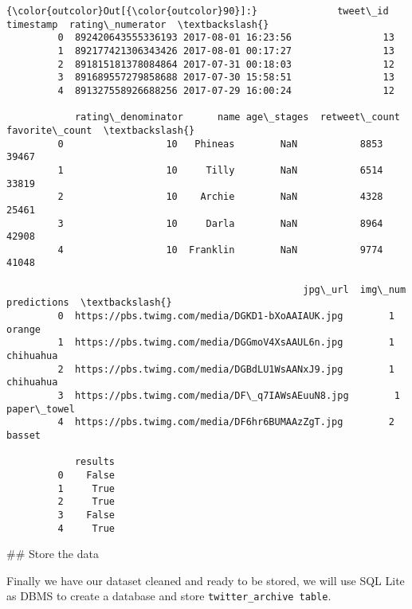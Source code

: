 \documentclass[11pt]{article}
\begin{document}
\begin{Verbatim}[commandchars=\\\{\}]
{\color{outcolor}Out[{\color{outcolor}90}]:}              tweet\_id           timestamp  rating\_numerator  \textbackslash{}
         0  892420643555336193 2017-08-01 16:23:56                13   
         1  892177421306343426 2017-08-01 00:17:27                13   
         2  891815181378084864 2017-07-31 00:18:03                12   
         3  891689557279858688 2017-07-30 15:58:51                13   
         4  891327558926688256 2017-07-29 16:00:24                12   
         
            rating\_denominator      name age\_stages  retweet\_count  favorite\_count  \textbackslash{}
         0                  10   Phineas        NaN           8853           39467   
         1                  10     Tilly        NaN           6514           33819   
         2                  10    Archie        NaN           4328           25461   
         3                  10     Darla        NaN           8964           42908   
         4                  10  Franklin        NaN           9774           41048   
         
                                                    jpg\_url  img\_num  predictions  \textbackslash{}
         0  https://pbs.twimg.com/media/DGKD1-bXoAAIAUK.jpg        1       orange   
         1  https://pbs.twimg.com/media/DGGmoV4XsAAUL6n.jpg        1    chihuahua   
         2  https://pbs.twimg.com/media/DGBdLU1WsAANxJ9.jpg        1    chihuahua   
         3  https://pbs.twimg.com/media/DF\_q7IAWsAEuuN8.jpg        1  paper\_towel   
         4  https://pbs.twimg.com/media/DF6hr6BUMAAzZgT.jpg        2       basset   
         
            results  
         0    False  
         1     True  
         2     True  
         3    False  
         4     True  
\end{Verbatim}
            
     \#\# Store the data

Finally we have our dataset cleaned and ready to be stored, we will use
SQL Lite as DBMS to create a database and store
\texttt{twitter\_archive\ table}.
\end{document}
